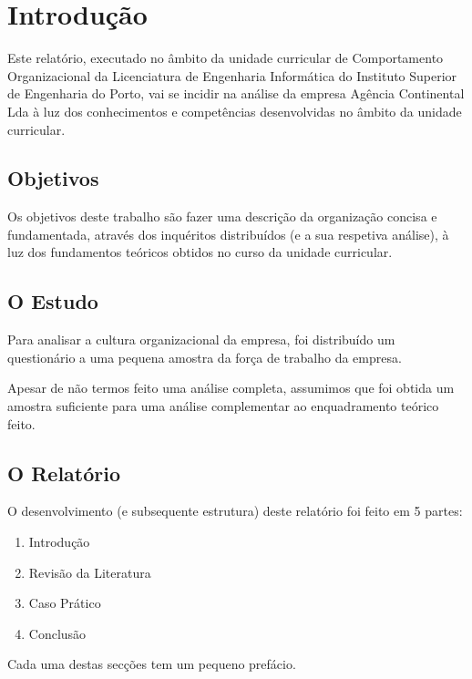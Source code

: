 
\section{Introdução}

Este relatório, executado no âmbito da unidade curricular de Comportamento Organizacional da Licenciatura de Engenharia Informática do Instituto Superior de Engenharia do Porto, vai se incidir na análise da empresa Agência Continental Lda à luz dos conhecimentos e competências desenvolvidas no âmbito da unidade curricular.

\subsection{Objetivos}

Os objetivos deste trabalho são fazer uma descrição da organização concisa e fundamentada, através dos inquéritos distribuídos (e a sua respetiva análise), à luz dos fundamentos teóricos obtidos no curso da unidade curricular.

\subsection{O Estudo}

Para analisar a cultura organizacional da empresa, foi distribuído um questionário a uma pequena amostra da força de trabalho da empresa.

Apesar de não termos feito uma análise completa, assumimos que foi obtida um amostra suficiente para uma análise complementar ao enquadramento teórico feito.

\subsection{O Relatório}

O desenvolvimento (e subsequente estrutura) deste relatório foi feito em 5 partes:

\begin{enumerate}
	\item Introdução
	\item Revisão da Literatura
	\item Caso Prático
	\item Conclusão
\end{enumerate}

Cada uma destas secções tem um pequeno prefácio.